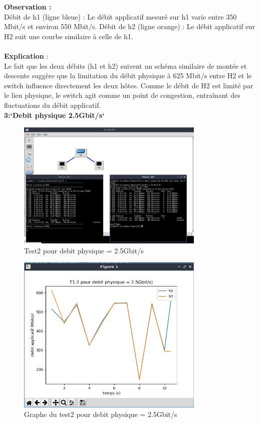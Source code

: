 \textbf{Observation :}\\
Débit de h1 (ligne bleue) : Le débit applicatif mesuré sur h1 varie entre 350 Mbit/s et environ 550 Mbit/s.
Débit de h2 (ligne orange) : Le débit applicatif sur H2 suit une courbe similaire à celle de h1.
\\
\\
\textbf{Explication} :\\
Le fait que les deux débits (h1 et h2) suivent un schéma similaire de montée et descente suggère que la limitation du débit physique à 625 Mbit/s entre H2 et le switch influence directement les deux hôtes. Comme le débit de H2 est limité par le lien physique, le switch agit comme un point de congestion, entraînant des fluctuations du débit applicatif.
\vspace{1cm}
\\
\newpage
\textbf{3:`Debit physique 2.5Gbit/s`} 
\begin{figure}[H]
    \centering
    \includegraphics[width=0.8\textwidth]{./images/T1.2/2500test2.png}
    \caption{Test2 pour debit physique = 2.5Gbit/s}
    \label{fig:exemple}
\end{figure}
\begin{figure}[H]
    \centering
    \includegraphics[width=0.8\textwidth]{./images/T1.2/courbe2500test2.png}
    \caption{Graphe du test2 pour debit physique = 2.5Gbit/s}
    \label{fig:exemple}
\end{figure}

